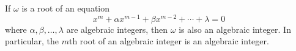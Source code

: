 If $\omega$ is a root of an equation
$$x^m + \alpha x^{m-1} + \beta x^{m-2} + \cdots + \lambda = 0$$
where $\alpha, \beta, \ldots, \lambda$ are algebraic integers, then $\omega$ is also an algebraic integer. In particular, the $m$th root of an algebraic integer is an algebraic integer.
